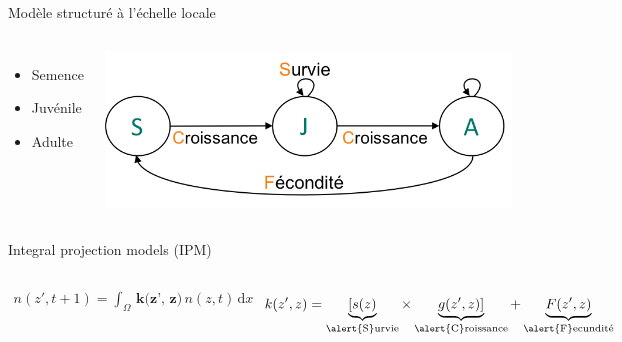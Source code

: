 \documentclass[11pt, compress, aspectratio=1610]{beamer}
\newcommand{\begincols}{\begin{columns}}
\newcommand{\stopcols}{\end{columns}}
\begin{document}
\begin{frame}{Modèle structuré à l’échelle locale}
\protect\hypertarget{moduxe8le-structuruxe9-uxe0-luxe9chelle-locale}{}

\begincols
{}
  \begin{itemize}
    \item
      {\color{plST}S}emence
    \item
      {\color{plST}J}uvénile
    \item
      {\color{plST}A}dulte
  \end{itemize}

\hfill{}
  \centering

\includegraphics[scale=0.65]{figures/cycle}

\par
\stopcols

\end{frame}

\begin{frame}{Integral projection models (IPM)}
\protect\hypertarget{integral-projection-models-ipm}{}

\begincols
{}

\begin{align*}
    n(z', t + 1) = \int_{\Omega} \, \textbf{k(z', z)}\, n(z, t)\, \mathrm{d}x
  \end{align*}

\begin{align*}
    k(z', z) = \underbrace{[s(z)}_\text{\alert{S}urvie}\times\underbrace{g(z', z)]}_\text{\alert{C}roissance} + \underbrace{F(z', z)}_\text{\alert{F}ecundité}
  \end{align*}

\hfill{}
 \centering

\includegraphics[scale=0.6]{figures/cycle_cont}

\par
\stopcols

\end{frame}
\end{document}
